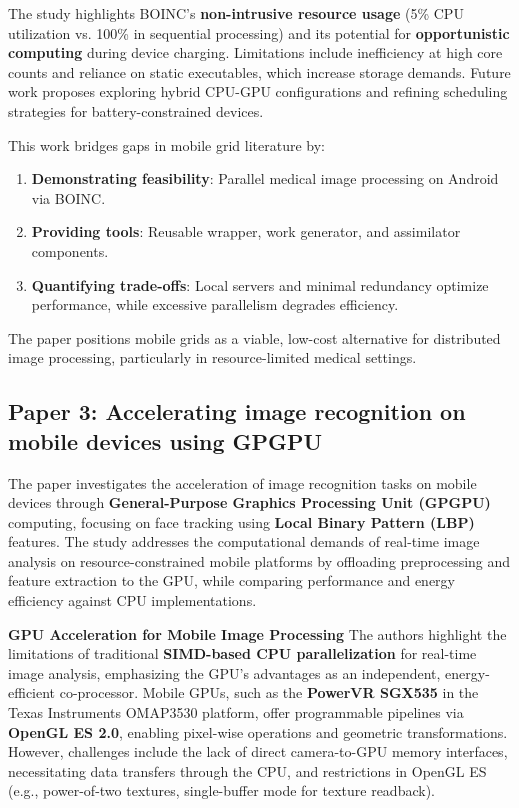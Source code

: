\documentclass[conference]{IEEEtran}
\begin{document}
The study highlights BOINC’s \textbf{non-intrusive resource usage} (5\% CPU utilization vs. 100\% in sequential processing) and its potential for \textbf{opportunistic computing} during device charging. Limitations include inefficiency at high core counts and reliance on static executables, which increase storage demands. Future work proposes exploring hybrid CPU-GPU configurations and refining scheduling strategies for battery-constrained devices.

This work bridges gaps in mobile grid literature by:

\begin{enumerate}
    \item \textbf{Demonstrating feasibility}: Parallel medical image processing on Android via BOINC.
    \item \textbf{Providing tools}: Reusable wrapper, work generator, and assimilator components.
    \item \textbf{Quantifying trade-offs}: Local servers and minimal redundancy optimize performance, while excessive parallelism degrades efficiency.
\end{enumerate}

The paper positions mobile grids as a viable, low-cost alternative for distributed image processing, particularly in resource-limited medical settings.

\subsection{Paper 3: Accelerating image recognition on mobile devices using
GPGPU}

The paper investigates the acceleration of image recognition tasks on mobile devices through \textbf{General-Purpose Graphics Processing Unit (GPGPU)} computing, focusing on face tracking using \textbf{Local Binary Pattern (LBP)} features. The study addresses the computational demands of real-time image analysis on resource-constrained mobile platforms by offloading preprocessing and feature extraction to the GPU, while comparing performance and energy efficiency against CPU implementations.

\textbf{GPU Acceleration for Mobile Image Processing}  
The authors highlight the limitations of traditional \textbf{SIMD-based CPU parallelization} for real-time image analysis, emphasizing the GPU's advantages as an independent, energy-efficient co-processor. Mobile GPUs, such as the \textbf{PowerVR SGX535} in the Texas Instruments OMAP3530 platform, offer programmable pipelines via \textbf{OpenGL ES 2.0}, enabling pixel-wise operations and geometric transformations. However, challenges include the lack of direct camera-to-GPU memory interfaces, necessitating data transfers through the CPU, and restrictions in OpenGL ES (e.g., power-of-two textures, single-buffer mode for texture readback).
\end{document}
